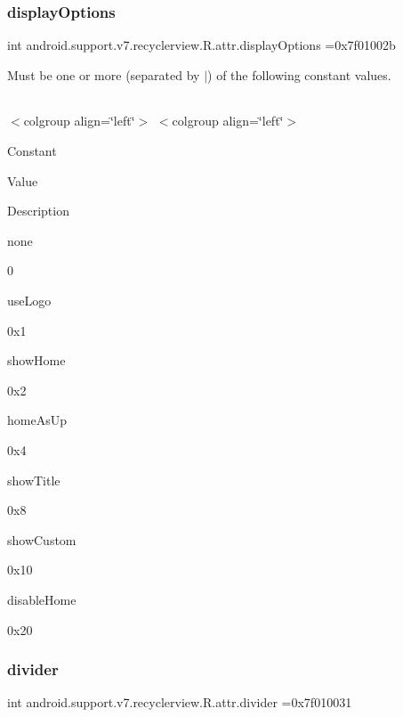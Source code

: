 \subsubsection{\texorpdfstring{display\+Options}{displayOptions}}
{\footnotesize\ttfamily int android.\+support.\+v7.\+recyclerview.\+R.\+attr.\+display\+Options =0x7f01002b\hspace{0.3cm}{\ttfamily [static]}}

Must be one or more (separated by \textquotesingle{}$\vert$\textquotesingle{}) of the following constant values.

\tabulinesep=1mm
\begin{longtabu} spread 0pt [c]{*{0}{|X[-1]}|}
\hline
\end{longtabu}
$<$colgroup align=\char`\"{}left\char`\"{}$>$ $<$colgroup align=\char`\"{}left\char`\"{}$>$ 

Constant

Value

Description 

{\ttfamily none}

0

{\ttfamily use\+Logo}

0x1

{\ttfamily show\+Home}

0x2

{\ttfamily home\+As\+Up}

0x4

{\ttfamily show\+Title}

0x8

{\ttfamily show\+Custom}

0x10

{\ttfamily disable\+Home}

0x20\mbox{\label{classandroid_1_1support_1_1v7_1_1recyclerview_1_1R_1_1attr_a74d702c9b84690c2930fa9d91aa3ef79}} 
\subsubsection{\texorpdfstring{divider}{divider}}
{\footnotesize\ttfamily int android.\+support.\+v7.\+recyclerview.\+R.\+attr.\+divider =0x7f010031\hspace{0.3cm}{\ttfamily [static]}}

